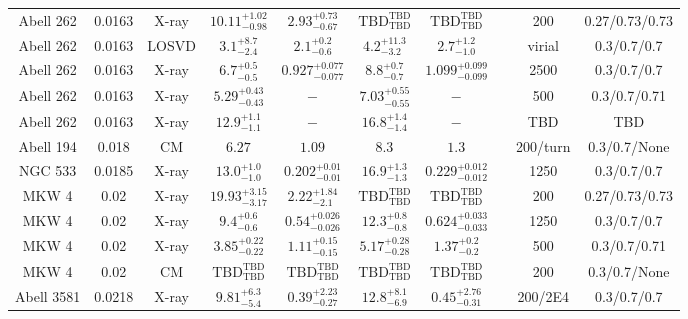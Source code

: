 \begin{table}
\begin{tabular}{cccccccccc}
Abell 262 & 0.0163 & X-ray & ${10.11}^{+1.02}_{-0.98}$ & ${2.93}^{+0.73}_{-0.67}$ & ${\mathrm{TBD}}^{\mathrm{TBD}}_{\mathrm{TBD}}$ & ${\mathrm{TBD}}^{\mathrm{TBD}}_{\mathrm{TBD}}$ & \citet{BA14.1} & 200 & 0.27/0.73/0.73 \\
Abell 262 & 0.0163 & LOSVD & ${3.1}^{+8.7}_{-2.4}$ & ${2.1}^{+0.2}_{-0.6}$ & ${4.2}^{+11.3}_{-3.2}$ & ${2.7}^{+1.2}_{-1.0}$ & \citet{LO06.1} & virial & 0.3/0.7/0.7 \\
Abell 262 & 0.0163 & X-ray & ${6.7}^{+0.5}_{-0.5}$ & ${0.927}^{+0.077}_{-0.077}$ & ${8.8}^{+0.7}_{-0.7}$ & ${1.099}^{+0.099}_{-0.099}$ & \citet{GA06.1} & 2500 & 0.3/0.7/0.7 \\
Abell 262 & 0.0163 & X-ray & ${5.29}^{+0.43}_{-0.43}$ & ${-}^{}_{}$ & ${7.03}^{+0.55}_{-0.55}$ & ${-}^{}_{}$ & \citet{VI05.1} & 500 & 0.3/0.7/0.71 \\
Abell 262 & 0.0163 & X-ray & ${12.9}^{+1.1}_{-1.1}$ & ${-}^{}_{}$ & ${16.8}^{+1.4}_{-1.4}$ & ${-}^{}_{}$ & \citet{XU01.1} & TBD & TBD \\
Abell 194 & 0.018 & CM & ${6.27}^{}_{}$ & ${1.09}^{}_{}$ & ${8.3}^{}_{}$ & ${1.3}^{}_{}$ & \citet{RI03.1} & 200/turn & 0.3/0.7/None \\
NGC 533 & 0.0185 & X-ray & ${13.0}^{+1.0}_{-1.0}$ & ${0.202}^{+0.01}_{-0.01}$ & ${16.9}^{+1.3}_{-1.3}$ & ${0.229}^{+0.012}_{-0.012}$ & \citet{GA06.1} & 1250 & 0.3/0.7/0.7 \\
MKW 4 & 0.02 & X-ray & ${19.93}^{+3.15}_{-3.17}$ & ${2.22}^{+1.84}_{-2.1}$ & ${\mathrm{TBD}}^{\mathrm{TBD}}_{\mathrm{TBD}}$ & ${\mathrm{TBD}}^{\mathrm{TBD}}_{\mathrm{TBD}}$ & \citet{BA14.1} & 200 & 0.27/0.73/0.73 \\
MKW 4 & 0.02 & X-ray & ${9.4}^{+0.6}_{-0.6}$ & ${0.54}^{+0.026}_{-0.026}$ & ${12.3}^{+0.8}_{-0.8}$ & ${0.624}^{+0.033}_{-0.033}$ & \citet{GA06.1} & 1250 & 0.3/0.7/0.7 \\
MKW 4 & 0.02 & X-ray & ${3.85}^{+0.22}_{-0.22}$ & ${1.11}^{+0.15}_{-0.15}$ & ${5.17}^{+0.28}_{-0.28}$ & ${1.37}^{+0.2}_{-0.2}$ & \citet{VI05.1} & 500 & 0.3/0.7/0.71 \\
MKW 4 & 0.02 & CM & ${\mathrm{TBD}}^{\mathrm{TBD}}_{\mathrm{TBD}}$ & ${\mathrm{TBD}}^{\mathrm{TBD}}_{\mathrm{TBD}}$ & ${\mathrm{TBD}}^{\mathrm{TBD}}_{\mathrm{TBD}}$ & ${\mathrm{TBD}}^{\mathrm{TBD}}_{\mathrm{TBD}}$ & \citet{RI06.1} & 200 & 0.3/0.7/None \\
Abell 3581 & 0.0218 & X-ray & ${9.81}^{+6.3}_{-5.4}$ & ${0.39}^{+2.23}_{-0.27}$ & ${12.8}^{+8.1}_{-6.9}$ & ${0.45}^{+2.76}_{-0.31}$ & \citet{VO06.1} & 200/2E4 & 0.3/0.7/0.7 \\

\end{tabular}
\end{table}
